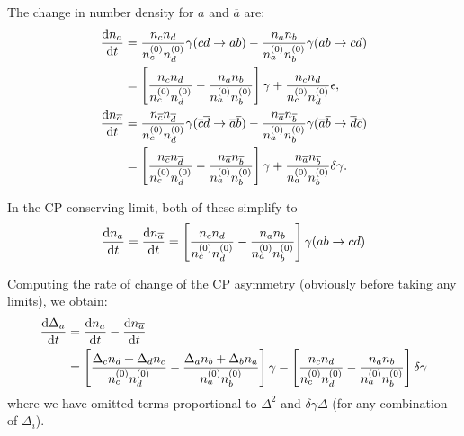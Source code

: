 \documentclass[
  a4paper,             %
  11pt,                %
  oneside,             %
  onecolumn,           %
  bibliography=totoc,  %
  final,               %
]{scrartcl}
\begin{document}
The change in number density for \(a\) and \(\overline{a}\) are:
\begin{align}
  \frac{\mathop{}\!\mathrm{d}{n_a}}{\mathop{}\!\mathrm{d}{t}}
   & = \frac{n_c n_d}{n_c^{(0)} n_d^{(0)}} \gamma(cd \to ab)
  - \frac{n_a n_b}{n_a^{(0)} n_b^{(0)}} \gamma(ab \to cd)                                                                      \\
   & = \left[
  \frac{n_c n_d}{n_c^{(0)} n_d^{(0)}}
  - \frac{n_a n_b}{n_a^{(0)} n_b^{(0)}}
  \right] \gamma
  + \frac{n_c n_d}{n_c^{(0)} n_d^{(0)}} \epsilon,                                                                              \\
  \frac{\mathop{}\!\mathrm{d}{n_{\overline a}}}{\mathop{}\!\mathrm{d}{t}}
   & = \frac{n_{\overline c} n_{\overline d}}{n_c^{(0)} n_d^{(0)}} \gamma(\overline c \overline d \to \overline a \overline b)
  - \frac{n_{\overline a} n_{\overline b}}{n_a^{(0)} n_b^{(0)}} \gamma(\overline a \overline b \to \overline d \overline c)    \\
   & = \left[
  \frac{n_{\overline c} n_{\overline d}}{n_c^{(0)} n_d^{(0)}}
  - \frac{n_{\overline a} n_{\overline b}}{n_a^{(0)} n_b^{(0)}}
  \right] \gamma
  + \frac{n_{\overline a} n_{\overline b}}{n_a^{(0)} n_b^{(0)}} \delta\gamma.                                                      \\
\end{align}

In the \gls{CP} conserving limit, both of these simplify to
\begin{equation}
  \frac{\mathop{}\!\mathrm{d}{n_a}}{\mathop{}\!\mathrm{d}{t}} = \frac{\mathop{}\!\mathrm{d}{n_{\overline a}}}{\mathop{}\!\mathrm{d}{t}}
  = \left[ \frac{n_c n_d}{n_c^{(0)} n_d^{(0)}}  - \frac{n_a n_b}{n_a^{(0)} n_b^{(0)}} \right] \gamma(ab \to cd)
\end{equation}

Computing the rate of change of the \gls{CP} asymmetry (obviously before
taking any limits), we obtain:
\begin{equation}
  \begin{aligned}
    \frac{\mathop{}\!\mathrm{d}{\Delta_a}}{\mathop{}\!\mathrm{d}{t}}
     & = \frac{\mathop{}\!\mathrm{d}{n_a}}{\mathop{}\!\mathrm{d}{t}} - \frac{\mathop{}\!\mathrm{d}{n_{\overline a}}}{\mathop{}\!\mathrm{d}{t}} \\
     & = \left[
    \frac{\Delta_c n_d + \Delta_d n_c}{n_c^{(0)} n_d^{(0)}}
    - \frac{\Delta_a n_b + \Delta_b n_a}{n_a^{(0)} n_b^{(0)}} \right] \gamma
    - \left[
      \frac{n_c n_d}{n_c^{(0)} n_d^{(0)}} - \frac{n_a n_b}{n_a^{(0)} n_b^{(0)}}
    \right] \delta\gamma
  \end{aligned}
\end{equation}
where we have omitted terms proportional to \(\Delta^2\) and \(\delta\gamma \Delta\)
(for any combination of \(\Delta_i\)).
\end{document}
